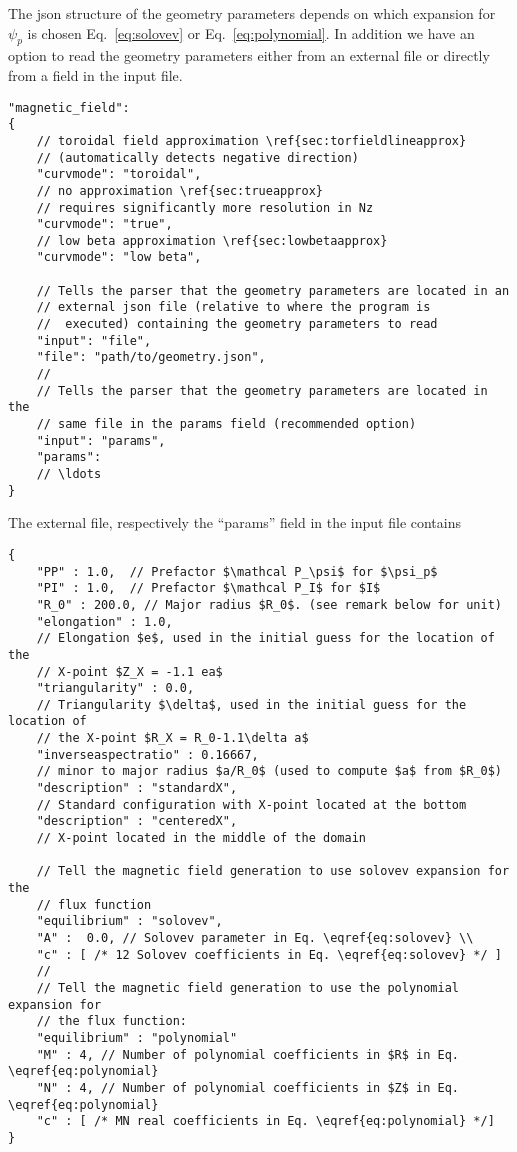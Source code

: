 The json structure of the geometry parameters depends on which expansion for $\psi_p$ is chosen Eq.~\eqref{eq:solovev} or Eq.~\eqref{eq:polynomial}.
In addition we have an option to read the geometry parameters either from an external
file or directly from a field in the input file.
\begin{verbatim}
"magnetic_field":
{
    // toroidal field approximation \ref{sec:torfieldlineapprox}
    // (automatically detects negative direction)
    "curvmode": "toroidal",
    // no approximation \ref{sec:trueapprox}
    // requires significantly more resolution in Nz
    "curvmode": "true",
    // low beta approximation \ref{sec:lowbetaapprox}
    "curvmode": "low beta",

    // Tells the parser that the geometry parameters are located in an
    // external json file (relative to where the program is
    //  executed) containing the geometry parameters to read
    "input": "file",
    "file": "path/to/geometry.json",
    //
    // Tells the parser that the geometry parameters are located in the
    // same file in the params field (recommended option)
    "input": "params",
    "params":
    // \ldots
}
\end{verbatim}
\noindent
The external file, respectively the ``params'' field in the input file
contains
\begin{verbatim}
{
    "PP" : 1.0,  // Prefactor $\mathcal P_\psi$ for $\psi_p$
    "PI" : 1.0,  // Prefactor $\mathcal P_I$ for $I$
    "R_0" : 200.0, // Major radius $R_0$. (see remark below for unit)
    "elongation" : 1.0,
    // Elongation $e$, used in the initial guess for the location of the
    // X-point $Z_X = -1.1 ea$
    "triangularity" : 0.0,
    // Triangularity $\delta$, used in the initial guess for the location of
    // the X-point $R_X = R_0-1.1\delta a$
    "inverseaspectratio" : 0.16667,
    // minor to major radius $a/R_0$ (used to compute $a$ from $R_0$)
    "description" : "standardX",
    // Standard configuration with X-point located at the bottom
    "description" : "centeredX",
    // X-point located in the middle of the domain

    // Tell the magnetic field generation to use solovev expansion for the
    // flux function
    "equilibrium" : "solovev",
    "A" :  0.0, // Solovev parameter in Eq. \eqref{eq:solovev} \\
    "c" : [ /* 12 Solovev coefficients in Eq. \eqref{eq:solovev} */ ]
    //
    // Tell the magnetic field generation to use the polynomial expansion for
    // the flux function:
    "equilibrium" : "polynomial"
    "M" : 4, // Number of polynomial coefficients in $R$ in Eq. \eqref{eq:polynomial}
    "N" : 4, // Number of polynomial coefficients in $Z$ in Eq. \eqref{eq:polynomial}
    "c" : [ /* MN real coefficients in Eq. \eqref{eq:polynomial} */]
}
\end{verbatim}
